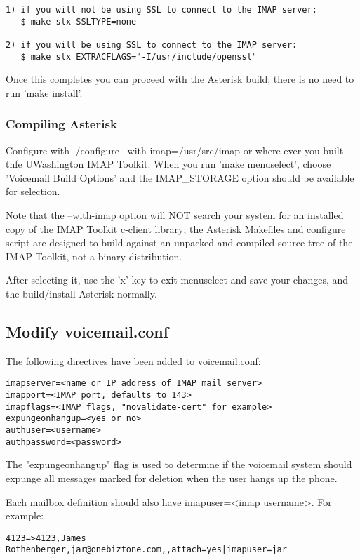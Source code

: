 \begin{verbatim}
1) if you will not be using SSL to connect to the IMAP server:
   $ make slx SSLTYPE=none

2) if you will be using SSL to connect to the IMAP server:
   $ make slx EXTRACFLAGS="-I/usr/include/openssl"
\end{verbatim}

Once this completes you can proceed with the Asterisk build; there is no
need to run 'make install'.

\subsubsection{Compiling Asterisk}

Configure with ./configure --with-imap=/usr/src/imap
or where ever you built thfe UWashington IMAP Toolkit. When you run
'make menuselect', choose 'Voicemail Build Options' and the
IMAP\_STORAGE option should be available for selection.

Note that the --with-imap option will NOT search your system for an
installed copy of the IMAP Toolkit c-client library; the Asterisk
Makefiles and configure script are designed to build against an
unpacked and compiled source tree of the IMAP Toolkit, not a binary
distribution.

After selecting it, use the 'x' key to exit menuselect and save
your changes, and the build/install Asterisk normally.

\subsection{Modify voicemail.conf}

The following directives have been added to voicemail.conf:

\begin{verbatim}
imapserver=<name or IP address of IMAP mail server>
imapport=<IMAP port, defaults to 143>
imapflags=<IMAP flags, "novalidate-cert" for example>
expungeonhangup=<yes or no>
authuser=<username>
authpassword=<password>
\end{verbatim}

The "expungeonhangup" flag is used to determine if the voicemail system should
expunge all messages marked for deletion when the user hangs up the phone. 

Each mailbox definition should also have imapuser=<imap username>.
For example:

\begin{verbatim}
4123=>4123,James Rothenberger,jar@onebiztone.com,,attach=yes|imapuser=jar
\end{verbatim}

